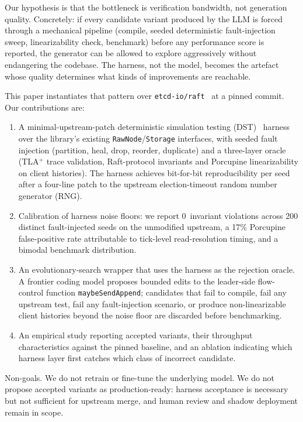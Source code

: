 \documentclass{article}
\begin{document}
Our hypothesis is that the bottleneck is verification bandwidth, not
generation quality. Concretely: if every candidate variant produced by
the LLM is forced through a mechanical pipeline (compile, seeded
deterministic fault-injection sweep, linearizability check,
benchmark) before any performance score is reported, the
generator can be allowed to explore aggressively without endangering
the codebase. The harness, not the model, becomes the artefact whose
quality determines what kinds of improvements are reachable.

This paper instantiates that pattern over
\texttt{etcd-io/raft}~\cite{etcdraft} at a pinned commit. Our contributions are:
\begin{enumerate}
  \item A minimal-upstream-patch deterministic simulation testing
    (DST)~\cite{fdbsim,foundationdb} harness over the library's existing
    \texttt{RawNode}/\texttt{Storage} interfaces, with
    seeded fault injection (partition, heal, drop, reorder,
    duplicate) and a three-layer oracle (TLA$^{+}$ trace validation, Raft-protocol invariants and
    Porcupine linearizability on client histories). The harness
    achieves bit-for-bit reproducibility per seed after a four-line
    patch to the upstream election-timeout random number generator
    (RNG).
  \item Calibration of harness noise floors: we report 0~invariant
    violations across 200 distinct fault-injected seeds on the
    unmodified upstream, a 17\% Porcupine false-positive rate
    attributable to tick-level read-resolution timing, and a
    bimodal benchmark distribution.
  \item An evolutionary-search wrapper that uses the harness as the
    rejection oracle. A frontier coding model proposes bounded edits
    to the leader-side flow-control function
    \texttt{maybeSendAppend}; candidates that fail to
    compile, fail any upstream test, fail any fault-injection
    scenario, or produce non-linearizable client histories beyond
    the noise floor are discarded before benchmarking.
  \item An empirical study reporting accepted variants, their
    throughput characteristics against the pinned baseline, and an
    ablation indicating which harness layer first catches which
    class of incorrect candidate.
\end{enumerate}

Non-goals.  We do not retrain or fine-tune the underlying model.  We
do not propose accepted variants as production-ready: harness
acceptance is necessary but not sufficient for upstream merge, and
human review and shadow deployment remain in scope.
\end{document}
